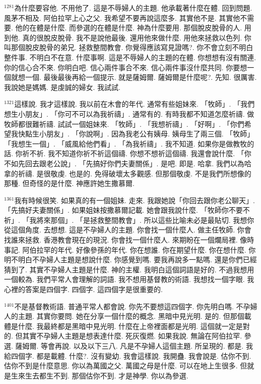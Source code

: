\documentclass{book}
\begin{document}
$^{1281}$為什麼要容他.
不用他了.
這是不辱婦人的主題.
他承載著什麼在體.
回到問題.
風茅不相及.
阿伯拉罕上心之父.
我希望不要再說這麼多.
其實他不是.
其實他不需要.
他的在體是什麼.
而參選的在體是什麼.
神為什麼要用.
那個脫皮脫骨的人.
用到他.
真的很脫皮脫骨.
我不是說他最後.
還用他來做什麼.
用他來拯救以色列.
你叫那個脫皮脫骨的弟兄.
拯救整間教會.
你覺得應該寫見證嗎?.
你不會立刻不明白整件事.
不明白不在意.
什麼事啊.
這是不辱婦人的主題的在體.
你想想有沒有關連.
你的信心合不來.
你明白吧.
信心兩件事合不來.
信心兩件事沒什麼共同.
你要想一個就想一個.
最後最後再給一個提示.
就是薩姆爾.
薩姆爾是什麼呢?.
先知.
很厲害.
我說她是媽媽.
是虔誠的婦女.
我試試.

$^{1321}$這樣說.
我才這樣說.
我以前在木會的年代.
通常有些姐妹來.
「牧師」.
「我們想生小朋友」.
「你可不可以為我祈禱」.
通常有的.
有時我都不知道怎麼祈禱.
做牧師都很難祈禱.
試試一個姐妹來.
「牧師」.
「我想祈禱」.
「好啊」.
「你們希望我快點生小朋友」.
「你說啊」.
因為我老公有姨母.
姨母生了兩三個.
「牧師」「我想生一個」.
「威風給他們看」.
「為我祈禱」.
我不知道.
如果你是做教牧的話.
你祈不祈.
我不知道你祈不祈這個禱.
你想不想祈這個禱.
我還會說什麼.
「你不如先回去跟老公說」.
「先搞好你們夫妻關係」.
是吧.
即是.
哈拿.
我們以為哈拿的祈禱.
是很敬虔.
也是的.
免得破壞太多觀感.
但那個敬虔.
不是我們所想像的那種.
但奇怪的是什麼.
神應許她生撒慕爾.

$^{1361}$我有時候很笑.
如果真的有一個姐妹.
走來.
我跟她說「你回去跟你老公聊天」.
「先搞好夫妻關係」.
如果姐妹按撒慕爾記載.
她會跟我說什麼.
「牧師你不要不祈」.
「我將來那個」.
「是拯救整間教會」.
所以這些比喻未必是最貼切.
我想你從這個角度.
去想想.
這是不孕婦人的主題.
你會找一個什麼人.
做主任牧師.
你會找誰來拯救.
香港教會現在的現況.
你會找一個什麼人.
來期盼在一個爛局裡.
像時事記.
阿伯拉罕的年代.
好像參孫的年代.
你在想誰.
你在期望什麼.
你在想什麼.
你明不明白不孕婦人主題是想說什麼.
你感覺到嗎.
要我再說多一點嗎.
還是你們已經猜到了.
其實不孕婦人主題是什麼.
神的主權.
我明白這個詞語是好的.
不過我想用一個較為.
我們平常人會理解的詞語.
我不想用基督教的術語.
我想找一個字眼.
我心裡的答案是四個字.
四個字.
這四個字是很重要的.

$^{1401}$不是基督教術語.
普通平常人都會說.
你先不要想這四個字.
你先明白嗎.
不孕婦人的主題.
其實你要問.
她在分享一個什麼的概念.
黑暗中見光明.
是的.
但那個載體是什麼.
我最終都是黑暗中見光明.
什麼在上帝裡面都是光明.
這個就一定是對的.
但其實不孕婦人主題是想表達什麼.
死灰復燃.
如果我說.
無論在阿伯拉罕.
參選.
薩姆爾.
等會再說.
以及以下三八.
凡是不孕婦人這個主題.
所呈現的.
都是.
我給四個字.
都是載體.
什麼?.
沒有變幼.
我會這樣說.
我開蠱.
我會說是.
估你不到.
估你不到是什麼意思.
你以為萬國之父.
萬國之母是什麼.
可以在地上生很多.
但就是生來生去都生不到.
那個估你不到.
才是神學.
你以為參選.
\end{document}

